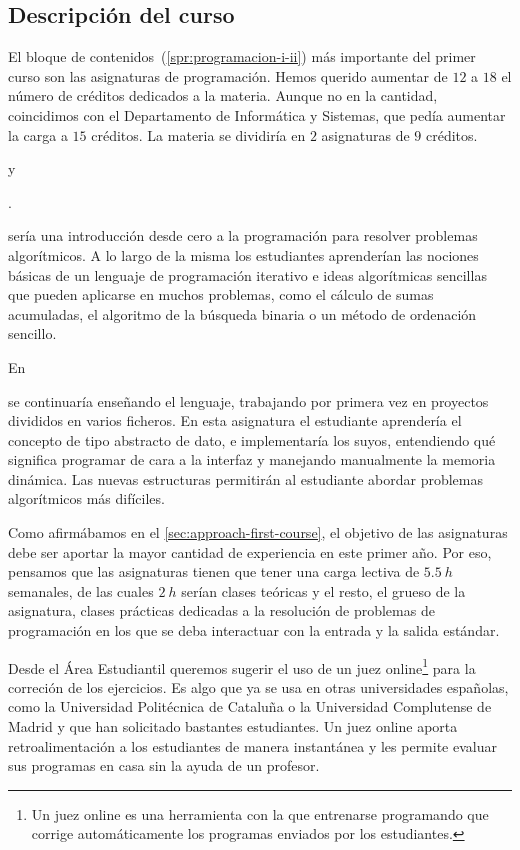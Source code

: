 \subsection{Descripción del curso}

El bloque de contenidos~(\cref{spr:programacion-i-ii})
más importante del primer curso son las asignaturas de programación.
Hemos querido aumentar de $12$ a $18$ el número de créditos
dedicados a la materia.
Aunque no en la cantidad,
coincidimos con el Departamento de Informática y Sistemas,
que pedía aumentar la carga a $15$ créditos.
La materia se dividiría en $2$ asignaturas de $9$ créditos.
\subject{Programación I} y \subject{Programación II}.

\subject{Programación I} sería una introducción desde cero a la programación
para resolver problemas algorítmicos.
A lo largo de la misma los estudiantes aprenderían las nociones básicas
de un lenguaje de programación iterativo e
ideas algorítmicas sencillas que pueden aplicarse en muchos problemas,
como el cálculo de sumas acumuladas,
el algoritmo de la búsqueda binaria
o un método de ordenación sencillo.

En \subject{Programación II} se continuaría enseñando el lenguaje,
trabajando por primera vez en proyectos divididos en varios ficheros.
En esta asignatura el estudiante aprendería
el concepto de tipo abstracto de dato,
e implementaría los suyos,
entendiendo qué significa programar de cara a la interfaz
y manejando manualmente la memoria dinámica.
Las nuevas estructuras permitirán al estudiante
abordar problemas algorítmicos más difíciles.

Como afirmábamos en el \cref{sec:approach-first-course},
el objetivo de las asignaturas debe ser
aportar la mayor cantidad de experiencia en este primer año.
Por eso, pensamos que las asignaturas
tienen que tener una carga lectiva de $\SI{5.5}{h}$ semanales,
de las cuales $\SI{2}{h}$ serían clases teóricas y el resto,
el grueso de la asignatura,
clases prácticas dedicadas a la resolución de problemas de programación
en los que se deba interactuar con la entrada y la salida estándar.

Desde el Área Estudiantil queremos sugerir el uso de un juez online\footnote{
    Un juez online es una herramienta con la que entrenarse programando
    que corrige automáticamente los programas enviados por los estudiantes.
} para la correción de los ejercicios.
Es algo que ya se usa en otras universidades españolas,
como la Universidad Politécnica de Cataluña o
la Universidad Complutense de Madrid y
que han solicitado bastantes estudiantes.
Un juez online aporta retroalimentación a los estudiantes de manera instantánea
y les permite evaluar sus programas en casa sin la ayuda de un profesor.

